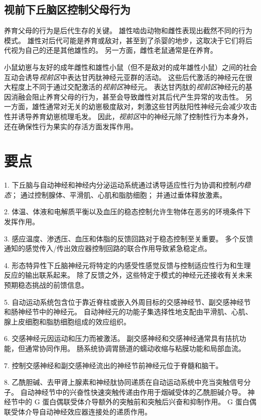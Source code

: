 \subsection{视前下丘脑区控制父母行为}

养育父母的行为是后代生存的关键。
雄性啮齿动物和雌性表现出截然不同的行为模式。
雄性对后代可能是养育或敌对，甚至到了杀婴的地步，这取决于它们将后代视为自己的还是其他雄性的。
另一方面，雌性老鼠通常是在养育。


小鼠幼崽与友好的成年雌性和雄性小鼠（但不是敌对的成年雄性小鼠）之间的社会互动会诱导\textit{视前区}中表达甘丙肽神经元亚群的活动。
这些后代激活的神经元在很大程度上不同于通过交配激活的\textit{视前区}神经元。
表达甘丙肽的\textit{视前区}神经元的基因消融会阻止养育父母的行为，甚至会导致雌性对其后代产生异常的攻击性。
另一方面，雄性通常对无关的幼崽极度敌对，刺激这些甘丙肽阳性神经元会减少攻击性并诱导养育幼崽梳理毛发。
因此，\textit{视前区}中的神经元除了控制性行为本身外，还在确保性行为果实的存活方面发挥作用。



\section{要点}

1. 下丘脑与自动神经和神经内分泌运动系统通过诱导适应性行为协调和控制\textit{内稳态}；
通过控制腺体、平滑肌、心肌和脂肪细胞；
并通过垂体释放激素。 


2. 体温、体液和电解质平衡以及血压的稳态控制允许生物体在恶劣的环境条件下发挥作用。


3. 感应温度、渗透压、血压和体脂的反馈回路对于稳态控制至关重要。
多个反馈通知的感觉传入/传出效应器控制回路的联合作用导致紧急稳定点。


4. 形态特异性下丘脑神经元将特定的内感受性感觉反馈与控制适应性行为和生理反应的输出联系起来。
除了反馈之外，这些特定于模式的神经元还接收有关未来预期稳态挑战的前馈信息。


5. 自动运动系统包含位于靠近脊柱或嵌入外周目标的交感神经节、副交感神经节和肠神经节中的神经元。
自动神经元的功能子集选择性地支配由平滑肌、心肌、腺上皮细胞和脂肪细胞组成的效应组织。


6. 交感神经元因运动和压力而被激活。
副交感神经和交感神经通常具有拮抗功能，但通常协同作用。
肠系统协调胃肠道的蠕动收缩与粘膜功能和局部血流。


7. 控制交感神经和副交感神经流出的神经节前神经元位于脊髓和脑干。


8. 乙酰胆碱、去甲肾上腺素和神经肽协同递质在自动运动系统中充当突触信号分子。
自动神经节中的兴奋性快速突触传递由作用于烟碱受体的乙酰胆碱介导。
神经节中的 G 蛋白偶联受体介导额外的突触前和突触后兴奋和抑制作用。
G 蛋白偶联受体介导自动神经效应器连接处的递质作用。 


